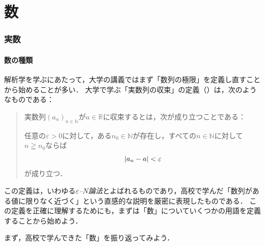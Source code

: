 \part{数}

\begin{abstract}
この章では，解析学の議論の土台となる「数」に関する用語や概念を整理する．まず高校までに学んだ数の体系を振り返り，自然数から複素数へと数を拡張してきた動機を確認する．次に，実数の順序構造に注目し，最大元・最小元，上界・下界といった概念を定義する．そのうえで，最大元・最小元の一般化として上限・下限を導入し，その判定条件をいくつかの形で与える．これらの概念は，で「実数の連続性」を述べるための言葉として不可欠なものである．
\end{abstract}

\section{実数}

\subsection{数の種類}

解析学を学ぶにあたって，大学の講義ではまず「数列の極限」を定義し直すことから始めることが多い．
大学で学ぶ「実数列の収束」の定義（）は，次のようなものである：
\begin{quotation}
  実数列$(a_n)_{n \in \mathbb{N}}$が$a \in \mathbb{R}$に収束するとは，次が成り立つことである：

  任意の$\varepsilon > 0$に対して，ある$n_0 \in \mathbb{N}$が存在し，すべての$n \in \mathbb{N}$に対して$n \geqq n_0$ならば
  \[
    \lvert a_n - a\rvert < \varepsilon
  \]
  が成り立つ．
\end{quotation}
この定義は，いわゆる\emph{$\varepsilon$--$N$論法}とよばれるものであり，高校で学んだ「数列がある値に限りなく近づく」という直感的な説明を厳密に表現したものである．
この定義を正確に理解するためにも，まずは「数」についていくつかの用語を定義することから始めよう．

まず，高校で学んできた「数」を振り返ってみよう．

